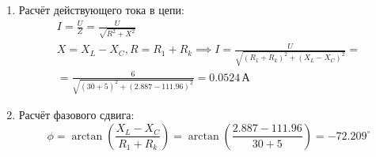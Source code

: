 \begin{enumerate}
	\item Расчёт действующего тока в цепи:
	      \[
		      \begin{gathered}
			      I = \frac{U}{Z} = \frac{U}{\sqrt{R^2 + X^2}} \\
			      X = X_L-X_C, R = R_1 + R_k \implies I = \frac{U}{\sqrt{(R_1+R_k)^2+(X_L-X_C)^2}} = \\
			      = \frac{6}{\sqrt{(30+5)^2+(2.887-111.96)^2}} = 0.0524 \, \text{А}
		      \end{gathered}
	      \]
	\item Расчёт фазового сдвига:
	      \[
		      \phi = \arctan\left(\frac{X_L-X_C}{R_1+R_k}\right) = \arctan\left(\frac{2.887-111.96}{30+5}\right) = -72.209^{\circ}
	      \]
\end{enumerate}
